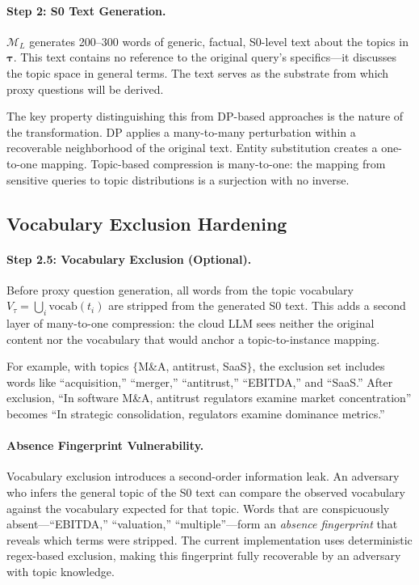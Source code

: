 \documentclass[sigconf,anonymous,review,balance=false]{acmart}
\begin{document}
\paragraph{Step 2: S0 Text Generation.} $\mathcal{M}_L$ generates 200--300 words of generic, factual, S0-level text about the topics in $\boldsymbol{\tau}$. This text contains no reference to the original query's specifics---it discusses the topic space in general terms. The text serves as the substrate from which proxy questions will be derived.

The key property distinguishing this from DP-based approaches is the nature of the transformation. DP applies a many-to-many perturbation within a recoverable neighborhood of the original text. Entity substitution creates a one-to-one mapping. Topic-based compression is many-to-one: the mapping from sensitive queries to topic distributions is a surjection with no inverse.

\subsection{Vocabulary Exclusion Hardening}
\label{sec:vocab-exclusion}

\paragraph{Step 2.5: Vocabulary Exclusion (Optional).} Before proxy question generation, all words from the topic vocabulary $V_\tau = \bigcup_i \text{vocab}(t_i)$ are stripped from the generated S0 text. This adds a second layer of many-to-one compression: the cloud LLM sees neither the original content nor the vocabulary that would anchor a topic-to-instance mapping.

For example, with topics $\{$M\&A, antitrust, SaaS$\}$, the exclusion set includes words like ``acquisition,'' ``merger,'' ``antitrust,'' ``EBITDA,'' and ``SaaS.'' After exclusion, ``In software M\&A, antitrust regulators examine market concentration'' becomes ``In strategic consolidation, regulators examine dominance metrics.''

\paragraph{Absence Fingerprint Vulnerability.} Vocabulary exclusion introduces a second-order information leak. An adversary who infers the general topic of the S0 text can compare the observed vocabulary against the vocabulary expected for that topic. Words that are conspicuously absent---``EBITDA,'' ``valuation,'' ``multiple''---form an \emph{absence fingerprint} that reveals which terms were stripped. The current implementation uses deterministic regex-based exclusion, making this fingerprint fully recoverable by an adversary with topic knowledge.
\end{document}
